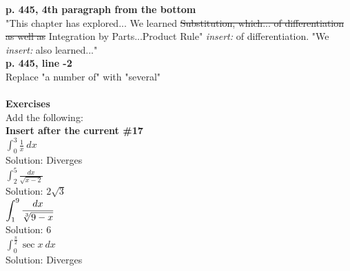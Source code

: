 \documentclass[11pt]{report}
\begin{document}
\textbf{p. 445, 4th paragraph from the bottom}\\
"This chapter has explored... We learned \sout{Substitution, which... of differentiation as well as} Integration by Parts...Product Rule" \textit{insert:} of differentiation. "We \textit{insert:} also learned..." \\

\textbf{p. 445, line -2}\\
Replace "a number of" with "several"\\ \\

\textbf{Exercises}\\
Add the following:\\

\textbf{Insert after the current \#17}\\

$\displaystyle \int_0^3 \frac{1}{x}~dx$\\

Solution: Diverges\\

$\displaystyle \int_2^5 \frac{dx}{\sqrt{x-2}}$\\

Solution: $2\sqrt 3$\\

$\displaystyle \int_1^9 \frac{dx}{\root 3 \of{9-x}}$\\

Solution: $6$\\

$\displaystyle \int_0^{\frac{\pi}{2}} \sec x~dx$\\

Solution: Diverges\\
\end{document}
